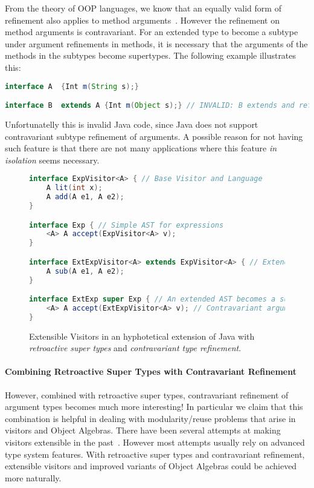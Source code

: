 \noindent From the theory of OOP languages, we know that an equally
valid form of refinement also applies to method arguments~\cite{}. However 
the refinement on method arguments is contravariant. For an
extended type to become a subtype under argument refinements in
methods, it is necessary that the arguments of the methods
in the subtypes become supertypes. The following example illustrates 
this: 

\begin{lstlisting}[language=java]
interface A  {Int m(String s);} 

interface B  extends A {Int m(Object s);} // INVALID: B extends and refines the return type of m()
\end{lstlisting}

\noindent Unfortunatelly this is invalid Java code, since Java 
does not support contravariant subtype refinement of arguments. 
A possible reason for not having such feature is that there are not
many applications where this feature \emph{in isolation} seems necessary. 

\begin{figure}
\begin{lstlisting}[language=java]
interface ExpVisitor<A> { // Base Visitor and Language
	A lit(int x);
	A add(A e1, A e2);
}

interface Exp { // Simple AST for expressions
	<A> A accept(ExpVisitor<A> v);
}

interface ExtExpVisitor<A> extends ExpVisitor<A> { // Extended Visitor and Language
	A sub(A e1, A e2);
}

interface ExtExp super Exp { // An extended AST becomes a supertype of the original one
	<A> A accept(ExtExpVisitor<A> v); // Contravariant argument refinement
}
\end{lstlisting}
\caption{Extensible Visitors in an hyphotetical
  extension of Java with \emph{retroactive super types} and \emph{contravariant
  type refinement}.}
\label{fig:JVis}
\end{figure}

\paragraph{Combining Retroactive Super Types with Contravariant Refinement}
However, combined with retroactive super types, contravariant
refinement of argument types becomes 
much more interesting! In particular we claim that this combination is 
helpful in dealing with modularity/reuse problems that arise in
visitors and Object Algebras. There have been several attempts 
at making visitors extensible in the past~\cite{}. However most
attempts usually rely on advanced type system features. With retroactive super
types and contravariant refinement, extensible visitors and improved
variants of Object Algebras could be achieved more naturally.  

